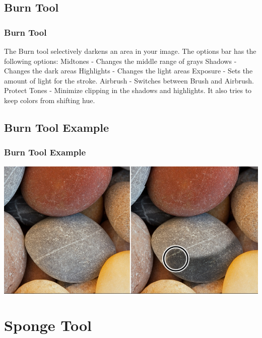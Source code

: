 \documentclass{beamer}
\begin{document}
		\subsection{Burn Tool}		
			\begin{frame}
				\frametitle{Burn Tool}
				\begin{outline}
					\1 The Burn tool selectively darkens an area in your image.
					\1 The options bar has the following options:
					\2 Midtones   - Changes the middle range of grays
					\2 Shadows    - Changes the dark areas
					\2 Highlights - Changes the light areas
					\2 Exposure   - Sets the amount of light for the stroke.
					\2 Airbrush   - Switches between Brush and Airbrush.
					\2 Protect Tones -  Minimize clipping in the shadows and highlights. It also tries to keep colors from shifting hue.
				\end{outline}
			\end{frame}
		
		\subsection{Burn Tool Example}		
			\begin{frame}
				\frametitle{Burn Tool Example}
				\includegraphics[width=1.0\textwidth]{images/burn tool example.png}
			\end{frame}
	
		\section{Sponge Tool}
\end{document}
